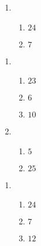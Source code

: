 \documentclass[12pt,twoside]{article}
\makeatletter
\def\emptycleardoublepage{\clearpage\if@twoside \ifodd\c@page\else
\thispagestyle{empty}%
\hbox{}\newpage\if@twocolumn\hbox{}\newpage\fi\fi\fi}
\makeatother
\begin{document}
\begin{multicols}{2}
\begin{enumerate}
\item \begin{enumerate}
\def \a{6}\def \b{18}\def \apb{24}
\item $\apb$
\def \a{14}\def \dif{7}\def \b{7}
\item $\dif$
\def \vshift{5}\def \hshift{-2}\def \chang{-2}\def \findval{-4}\def \yval{9}
\end{enumerate}
\end{enumerate}\end{multicols}\emptycleardoublepage{}\graphicspath{{/Users/jilan/Downloads/Randomizer/Randomizer/Sample Course/Sample Assessment 2/}}\begin{multicols}{2} \begin{enumerate}
\item \begin{enumerate}
\def \a{7}\def \b{16}\def \apb{23}
\item $\apb$
\def \a{14}\def \dif{6}\def \b{8}
\item $\dif$
\def \a{4}\def \b{6}\def \ab{10}
\item $\ab$
\def \vshift{-5}\def \hshift{0}\def \chang{-2}\def \findval{-2}\def \yval{-1}
\end{enumerate}

\item \begin{enumerate}
\def \a{10}\def \dif{5}\def \b{5}
\item $\dif$
\def \a{8}\def \b{17}\def \apb{25}
\item $\apb$
\def \vshift{1}\def \hshift{0}\def \chang{-1}\def \findval{-1}\def \yval{3}
\end{enumerate}
\end{enumerate}\end{multicols}\emptycleardoublepage{}\graphicspath{{/Users/jilan/Downloads/Randomizer/Randomizer/Sample Course/Sample Assessment 2/}}\begin{multicols}{2} \begin{enumerate}
\item \begin{enumerate}
\def \a{6}\def \b{18}\def \apb{24}
\item $\apb$
\def \a{13}\def \dif{7}\def \b{6}
\item $\dif$
\def \a{4}\def \b{8}\def \ab{12}
\item $\ab$
\def \vshift{-3}\def \hshift{2}\def \chang{2}\def \findval{4}\def \yval{-7}
\end{enumerate}


\end{enumerate}
\end{multicols}
\end{document}
